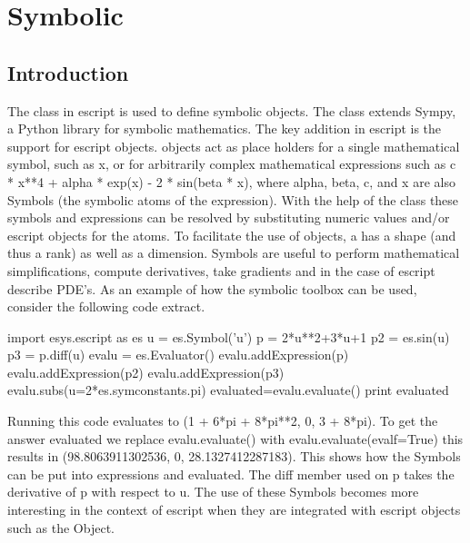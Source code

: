 \chapter{Symbolic}
\label{CHAP: Symbolic}
\section{Introduction}
The \SYMBOL class in escript is used to define symbolic objects. The class extends Sympy\cite{Sympy}, a Python library for symbolic mathematics. The key 
addition in escript is the support for escript objects. \SYMBOL objects act as place holders for a single mathematical symbol, 
such as x, or for arbitrarily complex mathematical expressions such as
c * x**4 + alpha * exp(x) - 2 * sin(beta * x), where alpha, beta, c, and x
are also Symbols (the symbolic atoms of the expression).
With the help of the \EVALUATOR class these symbols and expressions can
be resolved by substituting numeric values and/or escript \Data objects
for the atoms. To facilitate the use of \Data objects, a \SYMBOL has a
shape (and thus a rank) as well as a dimension.
Symbols are useful to perform mathematical simplifications,
compute derivatives, take gradients and in the case of escript describe PDE's. As an example of how the symbolic toolbox can be used, consider the following code extract.
\begin{python}
import esys.escript as es
u = es.Symbol('u')
p = 2*u**2+3*u+1
p2 = es.sin(u)
p3 = p.diff(u)
evalu = es.Evaluator()
evalu.addExpression(p)
evalu.addExpression(p2)
evalu.addExpression(p3)
evalu.subs(u=2*es.symconstants.pi)
evaluated=evalu.evaluate()
print evaluated
\end{python}
Running this code evaluates to (1 + 6*pi + 8*pi**2, 0, 3 + 8*pi).  To get the answer evaluated we replace evalu.evaluate() with evalu.evaluate(evalf=True) this results in (98.8063911302536, 0, 28.1327412287183). This shows how the Symbols can be put into expressions and evaluated. The diff member used on p takes the derivative of p with respect to u. The use of these Symbols becomes more interesting in the context of escript when they are integrated with escript objects such as the \Data Object. 
